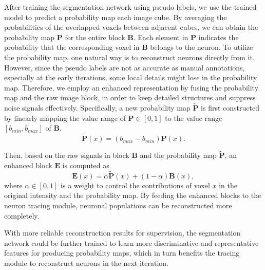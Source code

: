 After training the segmentation network using pseudo labels, we use the trained model to predict a probability map each image cube. 
By averaging the probabilities of the overlapped voxels between adjacent cubes, we can obtain the probability map $\mathbf{P}$ for the entire block $\mathbf{B}$.
Each element in $\mathbf{P}$ indicates the probability that the corresponding voxel in $ \mathbf{B} $ belongs to the neuron.
To utilize the probability map, one natural way is to reconstruct neurons directly from it.
However, since the pseudo labels are not as accurate as manual annotations, 
especially at the early iterations, some local details might lose in the probability map. Therefore, we employ an enhanced representation by fusing the probability map and the raw image block, in order to keep detailed structures and suppress noise signals effectively.
Specifically, a new probability map $\widetilde{\mathbf{P}} $ is first constructed by linearly mapping the value range of $ \mathbf{P}\in [0,1] $ to the value range $[{b}_{min}, {b}_{max}]$ of $\mathbf{B}$.
\begin{equation}
\widetilde{\mathbf{P}}(x) = ({b}_{max}-{b}_{min})\mathbf{P}(x).
\end{equation}


Then, based on the raw signals in block $\mathbf{B}$ and the probability map $\widetilde{\mathbf{P}}$, an enhanced block $\mathbf{E}$ is computed as
\begin{equation}
\mathbf{E}(x) = \alpha\widetilde{\mathbf{P}}(x) + (1-\alpha)\mathbf{B}(x),
\label{equ: enhance}
\end{equation}
where $\alpha\in [0,1]$ is a weight to control the contributions of voxel $ x $ in the original intensity and the probability map. By feeding the enhanced blocks to the neuron tracing module, neuronal populations can be reconstructed more completely.


With more reliable reconstruction results for supervision, the segmentation network could be further trained to learn more discriminative and representative features for producing probability maps, which in turn benefits the tracing module to reconstruct neurons in the next iteration.

